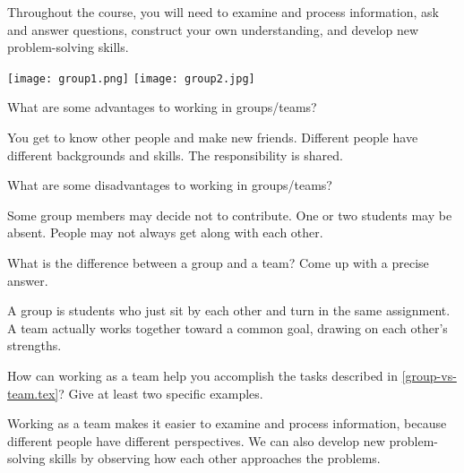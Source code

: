 

Throughout the course, you will need to examine and process information, ask and answer questions, construct your own understanding, and develop new problem-solving skills.

\begin{center}
\texttt{[image: group1.png]}
\hspace{0.5in}
\texttt{[image: group2.jpg]}
\end{center}




\Q What are some advantages to working in groups/teams?

\begin{answer}[5em]
You get to know other people and make new friends.
Different people have different backgrounds and skills.
The responsibility is shared.
\end{answer}


\Q What are some disadvantages to working in groups/teams?

\begin{answer}[5em]
Some group members may decide not to contribute.
One or two students may be absent.
People may not always get along with each other.
\end{answer}


\Q What is the difference between a group and a team?
Come up with a precise answer.

\begin{answer}[5em]
A group is students who just sit by each other and turn in the same assignment.
A team actually works together toward a common goal, drawing on each other's strengths.
\end{answer}


\Q How can working as a team help you accomplish the tasks described in \ref{group-vs-team.tex}?
Give at least two specific examples.

\begin{answer}[5em]
Working as a team makes it easier to examine and process information, because different people have different perspectives.
We can also develop new problem-solving skills by observing how each other approaches the problems.
\end{answer}
